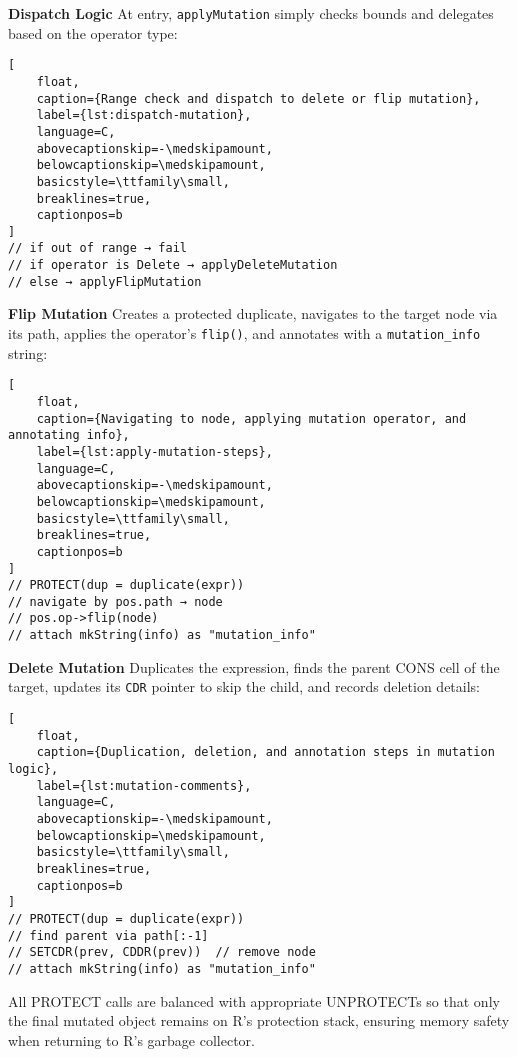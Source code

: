 \medskip
\noindent\textbf{Dispatch Logic}  
At entry, \texttt{applyMutation} simply checks bounds and delegates based on the operator type:

\begin{lstlisting}[
    float,
    caption={Range check and dispatch to delete or flip mutation},
    label={lst:dispatch-mutation},
    language=C,
    abovecaptionskip=-\medskipamount,
    belowcaptionskip=\medskipamount,
    basicstyle=\ttfamily\small,
    breaklines=true,
    captionpos=b
]
// if out of range → fail
// if operator is Delete → applyDeleteMutation
// else → applyFlipMutation
\end{lstlisting}


\medskip
\noindent\textbf{Flip Mutation}  
Creates a protected duplicate, navigates to the target node via its path, applies the operator’s \texttt{flip()}, and annotates with a \texttt{mutation\_info} string:

\begin{lstlisting}[
    float,
    caption={Navigating to node, applying mutation operator, and annotating info},
    label={lst:apply-mutation-steps},
    language=C,
    abovecaptionskip=-\medskipamount,
    belowcaptionskip=\medskipamount,
    basicstyle=\ttfamily\small,
    breaklines=true,
    captionpos=b
]
// PROTECT(dup = duplicate(expr))
// navigate by pos.path → node
// pos.op->flip(node)
// attach mkString(info) as "mutation_info"
\end{lstlisting}


\medskip
\noindent\textbf{Delete Mutation}  
Duplicates the expression, finds the parent CONS cell of the target, updates its \texttt{CDR} pointer to skip the child, and records deletion details:

\begin{lstlisting}[
    float,
    caption={Duplication, deletion, and annotation steps in mutation logic},
    label={lst:mutation-comments},
    language=C,
    abovecaptionskip=-\medskipamount,
    belowcaptionskip=\medskipamount,
    basicstyle=\ttfamily\small,
    breaklines=true,
    captionpos=b
]
// PROTECT(dup = duplicate(expr))
// find parent via path[:-1]
// SETCDR(prev, CDDR(prev))  // remove node
// attach mkString(info) as "mutation_info"
\end{lstlisting}


All PROTECT calls are balanced with appropriate UNPROTECTs so that only the final mutated object remains on R’s protection stack, ensuring memory safety when returning to R’s garbage collector.  


